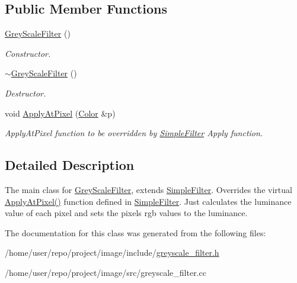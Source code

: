 \subsection*{Public Member Functions}
\begin{DoxyCompactItemize}
\item 
\mbox{\label{classGreyScaleFilter_a39c97682b954a5c00135eb4c13bddd47}} 
\hyperlink{classGreyScaleFilter_a39c97682b954a5c00135eb4c13bddd47}{Grey\+Scale\+Filter} ()
\begin{DoxyCompactList}\small\item\em Constructor. \end{DoxyCompactList}\item 
\mbox{\label{classGreyScaleFilter_a4df05a609fabbc1d4f4c455c53840c68}} 
\hyperlink{classGreyScaleFilter_a4df05a609fabbc1d4f4c455c53840c68}{$\sim$\+Grey\+Scale\+Filter} ()
\begin{DoxyCompactList}\small\item\em Destructor. \end{DoxyCompactList}\item 
\mbox{\label{classGreyScaleFilter_ac781a1ddd205f2d67d1c08481d5ab2e4}} 
void \hyperlink{classGreyScaleFilter_ac781a1ddd205f2d67d1c08481d5ab2e4}{Apply\+At\+Pixel} (\hyperlink{classColor}{Color} \&p)
\begin{DoxyCompactList}\small\item\em Apply\+At\+Pixel function to be overridden by \hyperlink{classSimpleFilter}{Simple\+Filter} Apply function. \end{DoxyCompactList}\end{DoxyCompactItemize}


\subsection{Detailed Description}
The main class for \hyperlink{classGreyScaleFilter}{Grey\+Scale\+Filter}, extends \hyperlink{classSimpleFilter}{Simple\+Filter}. Overrides the virtual \hyperlink{classGreyScaleFilter_ac781a1ddd205f2d67d1c08481d5ab2e4}{Apply\+At\+Pixel()} function defined in \hyperlink{classSimpleFilter}{Simple\+Filter}. Just calculates the luminance value of each pixel and sets the pixels rgb values to the luminance. 

The documentation for this class was generated from the following files\+:\begin{DoxyCompactItemize}
\item 
/home/user/repo/project/image/include/\hyperlink{greyscale__filter_8h}{greyscale\+\_\+filter.\+h}\item 
/home/user/repo/project/image/src/greyscale\+\_\+filter.\+cc\end{DoxyCompactItemize}

